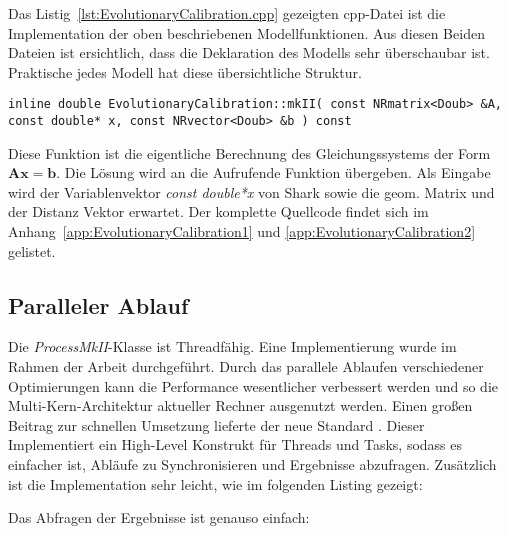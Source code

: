 %
%

\label{lst:EvolutionaryCalibration.h}
%
Das Listig~\ref{lst:EvolutionaryCalibration.cpp} gezeigten cpp-Datei ist die Implementation der oben beschriebenen Modellfunktionen. Aus diesen Beiden Dateien ist ersichtlich, dass die Deklaration des Modells sehr überschaubar ist. Praktische jedes Modell hat diese übersichtliche Struktur. 
%
\begin{lstlisting}[label=EvolutionaryCalibration_4]
inline double EvolutionaryCalibration::mkII( const NRmatrix<Doub> &A, const double* x, const NRvector<Doub> &b ) const
\end{lstlisting}
%
Diese Funktion ist die eigentliche Berechnung des Gleichungssystems der Form $\mathbf{A}\mathbf{x}=\textbf{b}$. Die Lösung wird an die Aufrufende Funktion übergeben. Als Eingabe wird der Variablenvektor \textit{const double*x} von Shark sowie die geom. Matrix und der Distanz Vektor erwartet.
%
Der komplette Quellcode findet sich im Anhang~\ref{app:EvolutionaryCalibration1} und \ref{app:EvolutionaryCalibration2} gelistet.
%
%

				 \label{lst:EvolutionaryCalibration.cpp}
%
\label{lst:shark_model}
%
%
\subsection{Paralleler Ablauf}
\label{lst:parallel_computing}
%
Die \textit{ProcessMkII}-Klasse ist Threadfähig. Eine Implementierung wurde im Rahmen der Arbeit durchgeführt. Durch das parallele Ablaufen verschiedener Optimierungen kann die Performance wesentlicher verbessert werden und so die Multi-Kern-Architektur aktueller Rechner ausgenutzt werden. Einen großen Beitrag zur schnellen Umsetzung lieferte der neue Standard . Dieser Implementiert ein High-Level Konstrukt für Threads und Tasks, sodass es einfacher ist, Abläufe zu Synchronisieren und Ergebnisse abzufragen. Zusätzlich ist die Implementation sehr leicht, wie im folgenden Listing gezeigt:
%

				 \label{lst:Parallel_example1.cpp}
%
\vspace{2mm}
Das Abfragen der Ergebnisse ist genauso einfach:
\vspace{2mm}
%

				 \label{lst:Parallel_example2.cpp}
%
\vspace{2mm}
%

